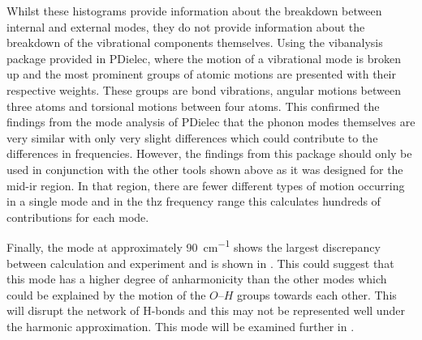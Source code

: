 Whilst these histograms provide information about the breakdown between internal and external modes, they do not provide information about the breakdown of the vibrational components themselves. Using the vibanalysis~\cite{Teixeira2018VMARD} package provided in PDielec, where the motion of a vibrational mode is broken up and the most prominent groups of atomic motions are presented with their respective weights. These groups are bond vibrations, angular motions between three atoms and torsional motions between four atoms. This confirmed the findings from the mode analysis of PDielec that the phonon modes themselves are very similar with only very slight differences which could contribute to the differences in frequencies. However, the findings from this package should only be used in conjunction with the other tools shown above as it was designed for the mid\nobreakdash-\acrshort{ir} region. In that region, there are fewer different types of motion occurring in a single mode and in the \acrshort{thz} frequency range this calculates hundreds of contributions for each mode. 

Finally, the mode at approximately \SI{90}{cm^{-1}} shows the largest discrepancy between calculation and experiment and is shown in . This could suggest that this mode has a higher degree of anharmonicity than the other modes which could be explained by the motion of the \(O\)\nobreakdash--\(H\) groups towards each other. This will disrupt the network of H\nobreakdash-bonds and this may not be represented well under the harmonic approximation. This mode will be examined further in .

